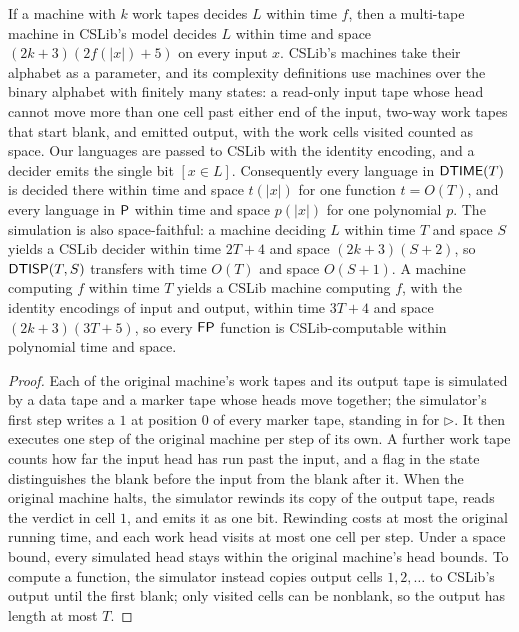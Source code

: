 \begin{theorem}
  \label{thm:polytime-cslib-multitape}
  \leanok
  If a machine with $k$ work tapes decides $L$ within time $f$, then a
  multi-tape machine in CSLib's model decides $L$ within time and space
  $(2k + 3)(2f(|x|) + 5)$ on every input $x$. CSLib's machines take their
  alphabet as a parameter, and its complexity definitions use machines over
  the binary alphabet with finitely many states: a read-only input tape whose
  head cannot move more than one cell past either end of the input, two-way
  work tapes that start blank, and emitted output, with the work cells visited
  counted as space. Our languages are passed to CSLib with the identity
  encoding, and a decider emits the single bit $[x \in L]$. Consequently every
  language in $\mathsf{DTIME}(T)$ is decided there within time and space $t(|x|)$
  for one function $t = O(T)$, and every language in $\mathsf{P}$ within time and
  space $p(|x|)$ for one polynomial $p$. The simulation is also
  space-faithful: a machine deciding $L$ within time $T$ and space $S$ yields a
  CSLib decider within time $2T + 4$ and space $(2k + 3)(S + 2)$, so
  $\mathsf{DTISP}(T, S)$ transfers with time $O(T)$ and space $O(S + 1)$. A machine
  computing $f$ within time $T$ yields a CSLib machine computing $f$, with the
  identity encodings of input and output, within time $3T + 4$ and space
  $(2k + 3)(3T + 5)$, so every $\mathsf{FP}$ function is CSLib-computable within
  polynomial time and space.
\end{theorem}
\begin{proof}
  \leanok
  Each of the original machine's work tapes and its output tape is simulated
  by a data tape and a marker tape whose heads move together; the simulator's
  first step writes a $1$ at position $0$ of every marker tape, standing in
  for $\triangleright$. It then executes one step of the original machine per
  step of its own. A further work tape counts how far the input head has run
  past the input, and a flag in the state distinguishes the blank before the
  input from the blank after it. When the original machine halts, the
  simulator rewinds its copy of the output tape, reads the verdict in cell
  $1$, and emits it as one bit. Rewinding costs at most the original running
  time, and each work head visits at most one cell per step. Under a space
  bound, every simulated head stays within the original machine's head
  bounds. To compute a function, the simulator instead copies output cells
  $1, 2, \ldots$ to CSLib's output until the first blank; only visited cells
  can be nonblank, so the output has length at most $T$.
\end{proof}

